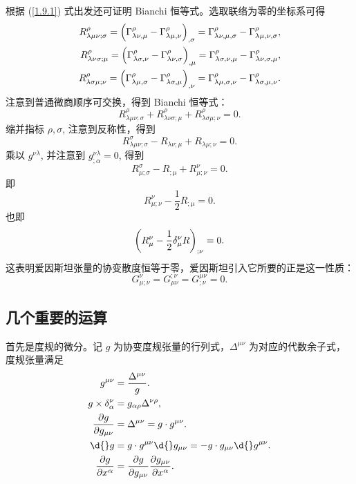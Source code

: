 \documentclass[UTF8, 12pt, a4paper, oneside, onecolumn, fontset=none]{ctexart}
\begin{document}
根据 (\ref{1.9.1}) 式出发还可证明 Bianchi 恒等式。选取联络为零的坐标系可得
\begin{align}
R^{\rho}_{\lambda\mu\nu;\sigma}=\mleft(\Gamma^{\rho}_{\lambda\nu,\mu}-\Gamma_{\lambda\mu,\nu}^{\rho}\mright)_{,\sigma}=\Gamma^{\rho}_{\lambda\nu,\mu,\sigma}-\Gamma^{\rho}_{\lambda\mu,\nu,\sigma},\\
R^{\rho}_{\lambda\nu\sigma;\mu}=\mleft(\Gamma^{\rho}_{\lambda\sigma,\nu}-\Gamma_{\lambda\nu,\sigma}^{\rho}\mright)_{,\mu}=\Gamma^{\rho}_{\lambda\sigma,\nu,\mu}-\Gamma^{\rho}_{\lambda\nu,\sigma,\mu},\\
R^{\rho}_{\lambda\sigma\mu;\nu}=\mleft(\Gamma^{\rho}_{\lambda\mu,\sigma}-\Gamma_{\lambda\sigma,\mu}^{\rho}\mright)_{,\nu}=\Gamma^{\rho}_{\lambda\mu,\sigma,\nu}-\Gamma^{\rho}_{\lambda\sigma,\mu,\nu}.
\end{align}
注意到普通微商顺序可交换，得到 Bianchi 恒等式：
\begin{equation}
R^{\rho}_{\lambda\mu\nu;\sigma}+R^{\rho}_{\lambda\nu\sigma;\mu}+R^{\rho}_{\lambda\sigma\mu;\nu}=0.
\end{equation}
缩并指标 $\rho,\sigma$, 注意到反称性，得到
\begin{equation}
R^{\sigma}_{\lambda\mu\nu;\sigma}-R_{\lambda\nu;\mu}+R_{\lambda\mu;\nu}=0.
\end{equation}
乘以 $g^{\nu\lambda}$, 并注意到 $g^{\nu\lambda}_{;\alpha}=0$, 得到
\begin{equation}
R^{\sigma}_{\mu;\sigma}-R_{;\mu}+R^{\nu}_{\mu;\nu}=0.
\end{equation}
即
\begin{equation}
R^{\nu}_{\mu;\nu}-\frac{1}{2}R_{;\mu}=0.
\end{equation}
也即
\begin{equation}
\mleft(R^{\nu}_{\mu}-\frac{1}{2}\delta_{\mu}^{\nu}R\mright)_{;\nu}=0.
\end{equation}
这表明爱因斯坦张量的协变散度恒等于零，爱因斯坦引入它所要的正是这一性质：
\begin{equation}
G_{\mu;\nu}^{\nu}=G_{\mu\nu}^{;\nu}=G^{\mu\nu}_{;\nu}=0.
\end{equation}

\subsection{几个重要的运算}
首先是度规的微分。记 $g$ 为协变度规张量的行列式，$\Delta^{\mu\nu}$ 为对应的代数余子式，度规张量满足
\begin{align}
g^{\mu\nu}&=\frac{\Delta^{\mu\nu}}{g}.\\
g\times\delta_{\alpha}^{\nu}&=g_{\alpha\rho}\Delta^{\nu\rho},\\
\frac{\partial{}g}{\partial{}g_{\mu\nu}}&=\Delta^{\mu\nu}=g\cdot g^{\mu\nu}.\\
\d{}g&=g\cdot g^{\mu\nu}\d{}g_{\mu\nu}=-g\cdot g_{\mu\nu}\d{}g^{\mu\nu}.\\
\frac{\partial{}g}{\partial{}x^{\alpha}}&=\frac{\partial{}g}{\partial{}g_{\mu\nu}}\frac{\partial{}g_{\mu\nu}}{\partial{}x^{\alpha}}.
\end{align}
\end{document}
